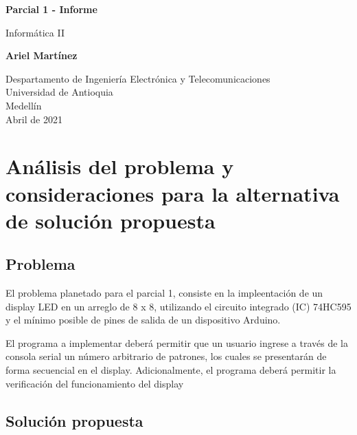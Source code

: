 \documentclass{article}
\begin{document}
\begin{titlepage}
    \begin{center}
        \vspace*{1cm}
            
        \Huge
        \textbf{Parcial 1 - Informe}
            
        \vspace{0.5cm}
        \LARGE
        Informática II
            
        \vspace{1.5cm}
            
        \textbf{Ariel Martínez}
            
        \vfill
            
        \vspace{0.8cm}
            
        \Large
        Despartamento de Ingeniería Electrónica y Telecomunicaciones\\
        Universidad de Antioquia\\
        Medellín\\
        Abril de 2021
            
    \end{center}
\end{titlepage}

\tableofcontents
\newpage
\section{Análisis del problema y consideraciones para la alternativa de solución propuesta}\label{analisis}

\subsection{Problema}

El problema planetado para el parcial 1, consiste en la impleentación de un display LED en un arreglo de 8 x 8, utilizando el circuito integrado (IC) 74HC595 y el mínimo posible de pines de salida de un dispositivo Arduino.

El programa a implementar deberá permitir que un usuario ingrese a través de la consola serial un número arbitrario de patrones, los cuales se presentarán de forma secuencial en el display. Adicionalmente, el programa deberá permitir la verificación del funcionamiento del display

\subsection{Solución propuesta}
\end{document}
